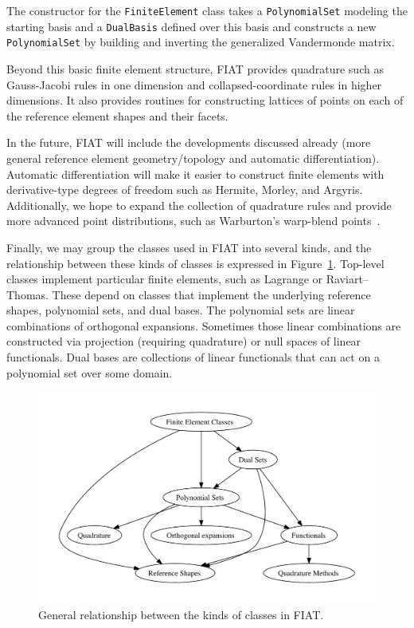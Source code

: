 The constructor for the \texttt{FiniteElement} class takes
a \texttt{PolynomialSet} modeling the starting basis and a
\texttt{DualBasis} defined over this basis and constructs a new
\texttt{PolynomialSet} by building and inverting the generalized
Vandermonde matrix.

Beyond this basic finite element structure, FIAT provides quadrature such
as Gauss-Jacobi rules in one dimension and collapsed-coordinate rules in
higher dimensions.  It also provides routines for constructing lattices
of points on each of the reference element shapes and their facets.

In the future, FIAT will include the developments discussed already
(more general reference element geometry/topology and automatic
differentiation).  Automatic differentiation will make it easier
to construct finite elements with derivative-type degrees
of freedom such as Hermite, Morley, and Argyris.  Additionally,
we hope to expand the collection of quadrature rules and provide
more advanced point distributions, such as Warburton's warp-blend
points~\citep{Warburton2005}.

Finally, we may group the classes used in FIAT into several kinds,
and the relationship between these kinds of classes is expressed in
Figure~\ref{fig:struct}.  Top-level classes implement particular finite
elements, such as Lagrange or Raviart--Thomas.  These depend on classes
that implement the underlying reference shapes, polynomial sets, and
dual bases.  The polynomial sets are linear combinations of orthogonal
expansions.  Sometimes those linear combinations are constructed via
projection (requiring quadrature) or null spaces of linear functionals.
Dual bases are collections of linear functionals that can act on a
polynomial set over some domain.

\begin{figure}
  \centering
  \includegraphics[width=\largefig]{chapters/kirby-2/pdf/struct.pdf}
  \caption{General relationship between the kinds of classes in FIAT.}
  \label{fig:struct}
\end{figure}
